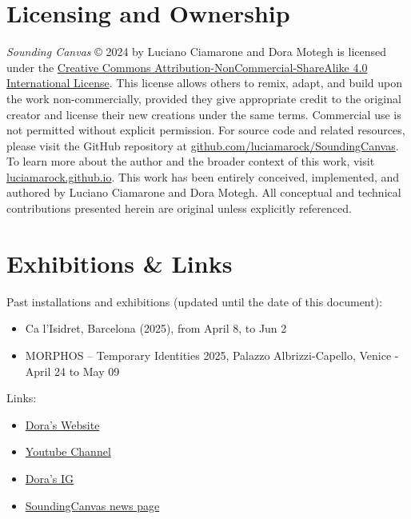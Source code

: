 \documentclass{article}
\begin{document}
\section{Licensing and Ownership}
\textit{Sounding Canvas} © 2024 by Luciano Ciamarone and Dora Motegh is licensed under the \href{https://creativecommons.org/licenses/by-nc-sa/4.0/}{Creative Commons Attribution-NonCommercial-ShareAlike 4.0 International License}.
\newline
This license allows others to remix, adapt, and build upon the work non-commercially, provided they give appropriate credit to the original creator and license their new creations under the same terms. Commercial use is not permitted without explicit permission.
\newline
For source code and related resources, please visit the GitHub repository at \href{https://github.com/luciamarock/SoundingCanvas}{github.com/luciamarock/SoundingCanvas}.  
To learn more about the author and the broader context of this work, visit \href{https://luciamarock.github.io/}{luciamarock.github.io}. \newline 
This work has been entirely conceived, implemented, and authored by Luciano Ciamarone and Dora Motegh. \newline 
All conceptual and technical contributions presented herein are original unless explicitly referenced.


\section{Exhibitions \& Links}
Past installations and exhibitions (updated until the date of this document):
\begin{itemize}
	\item Ca l’Isidret, Barcelona (2025), from  April 8, to Jun 2
	\item MORPHOS – Temporary Identities 2025, Palazzo Albrizzi-Capello, Venice - April 24 to May 09
\end{itemize}
Links: 
\begin{itemize}
	\item \href{https://doramoteque-faf94c.webflow.io/}{Dora's Website}
	\item \href{https://www.youtube.com/@doradynamicdesign}{Youtube Channel}
	\item \href{https://www.instagram.com/doramoteque/}{Dora's IG}
	\item \href{https://luciamarock.github.io/news/soundingcanvas.html}{SoundingCanvas news page}
\end{itemize}
\end{document}
